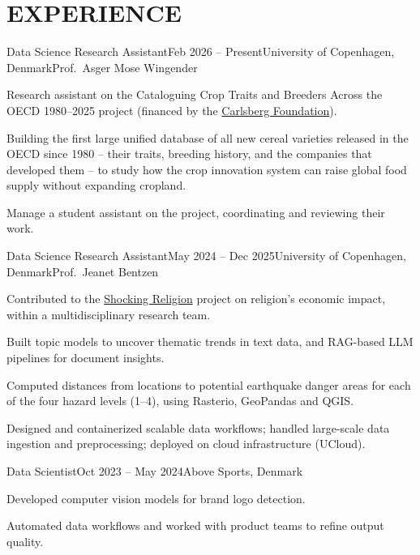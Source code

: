 \documentclass{resume}
\begin{document}
\section{EXPERIENCE}
\begin{content}

    \begin{position}{Data Science Research Assistant}{Feb 2026 -- Present}{University of Copenhagen, Denmark}{Prof.~Asger Mose Wingender}{}
        \item Research assistant on the Cataloguing Crop Traits and Breeders Across the OECD 1980--2025 project (financed by the \href{https://www.carlsbergfondet.dk/en/}{Carlsberg Foundation}).
        \item Building the first large unified database of all new cereal varieties released in the OECD since 1980 -- their traits, breeding history, and the companies that developed them -- to study how the crop innovation system can raise global food supply without expanding cropland.
        \item Manage a student assistant on the project, coordinating and reviewing their work.
    \end{position}

    \begin{position}{Data Science Research Assistant}{May 2024 -- Dec 2025}{University of Copenhagen, Denmark}{Prof.~Jeanet Bentzen}{}
        \item Contributed to the {\href{https://www.economics.ku.dk/research/externally-funded-research_new/shocking-religion/}{Shocking Religion}} project on religion's economic impact, within a multidisciplinary research team.
        \item Built topic models to uncover thematic trends in text data, and RAG-based LLM pipelines for document insights.
        \item Computed distances from locations to potential earthquake danger areas for each of the four hazard levels (1--4), using Rasterio, GeoPandas and QGIS.
        \item Designed and containerized scalable data workflows; handled large-scale data ingestion and preprocessing; deployed on cloud infrastructure (UCloud).
    \end{position}

    \begin{position}{Data Scientist}{Oct 2023 -- May 2024}{Above Sports, Denmark}{}{}
        \item Developed computer vision models for brand logo detection.
        \item Automated data workflows and worked with product teams to refine output quality.
    \end{position}


\end{content}
\end{document}
